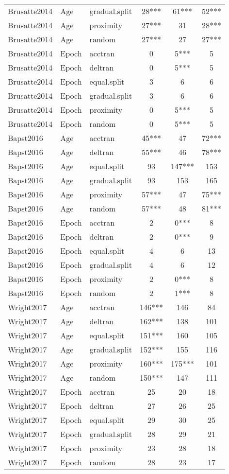 \begin{longtable}{lllccc}
  Brusatte2014 & Age & gradual.split & 28*** & 61*** & 52*** \\ 
  Brusatte2014 & Age & proximity & 27*** & 31 & 28*** \\ 
  Brusatte2014 & Age & random & 27*** & 27 & 27*** \\ 
  Brusatte2014 & Epoch & acctran & 0 & 5*** & 5 \\ 
  Brusatte2014 & Epoch & deltran & 0 & 5*** & 5 \\ 
  Brusatte2014 & Epoch & equal.split & 3 & 6 & 6 \\ 
  Brusatte2014 & Epoch & gradual.split & 3 & 6 & 6 \\ 
  Brusatte2014 & Epoch & proximity & 0 & 5*** & 5 \\ 
  Brusatte2014 & Epoch & random & 0 & 5*** & 5 \\ 
  Bapst2016 & Age & acctran & 45*** & 47 & 72*** \\ 
  Bapst2016 & Age & deltran & 55*** & 46 & 78*** \\ 
  Bapst2016 & Age & equal.split & 93 & 147*** & 153 \\ 
  Bapst2016 & Age & gradual.split & 93 & 153 & 165 \\ 
  Bapst2016 & Age & proximity & 57*** & 47 & 75*** \\ 
  Bapst2016 & Age & random & 57*** & 48 & 81*** \\ 
  Bapst2016 & Epoch & acctran & 2 & 0*** & 8 \\ 
  Bapst2016 & Epoch & deltran & 2 & 0*** & 9 \\ 
  Bapst2016 & Epoch & equal.split & 4 & 6 & 13 \\ 
  Bapst2016 & Epoch & gradual.split & 4 & 6 & 12 \\ 
  Bapst2016 & Epoch & proximity & 2 & 0*** & 8 \\ 
  Bapst2016 & Epoch & random & 2 & 1*** & 8 \\ 
  Wright2017 & Age & acctran & 146*** & 146 & 84 \\ 
  Wright2017 & Age & deltran & 162*** & 138 & 101 \\ 
  Wright2017 & Age & equal.split & 151*** & 160 & 105 \\ 
  Wright2017 & Age & gradual.split & 152*** & 155 & 116 \\ 
  Wright2017 & Age & proximity & 160*** & 175*** & 101 \\ 
  Wright2017 & Age & random & 150*** & 147 & 111 \\ 
  Wright2017 & Epoch & acctran & 25 & 20 & 18 \\ 
  Wright2017 & Epoch & deltran & 27 & 26 & 25 \\ 
  Wright2017 & Epoch & equal.split & 29 & 30 & 25 \\ 
  Wright2017 & Epoch & gradual.split & 28 & 29 & 21 \\ 
  Wright2017 & Epoch & proximity & 23 & 28 & 18 \\ 
  Wright2017 & Epoch & random & 28 & 23 & 17 \\ 
  \hline

\end{longtable}

